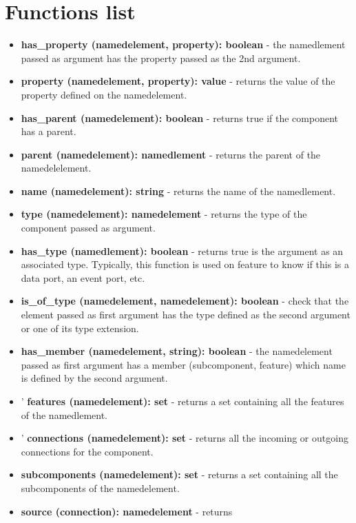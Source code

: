 \documentclass[times, 10pt]{article}
\begin{document}
\section{Functions list}
\begin{itemize}
    \item
	    \textbf{has\_property (namedelement, property): boolean} - the
        namedlement passed as argument has the property passed as the 2nd
        argument.
    \item
	    \textbf{property (namedelement, property): value} - returns
        the value of the property defined on the namedelement.
    \item
	    \textbf{has\_parent (namedelement): boolean} - returns
        true if the component has a parent.
    \item
	    \textbf{parent (namedelement): namedlement} - returns
        the parent of the namedelelement.
    \item
	    \textbf{name (namedelement): string} - returns the name of the
        namedlement.
    \item
	    \textbf{type (namedelement): namedelement} - returns the type
        of the component passed as argument.
    \item
	    \textbf{has\_type (namedlement): boolean} - returns true
        is the argument as an associated type. Typically, this function
        is used on feature to know if this is a data port, an event port, etc.
    \item
        \textbf{is\_of\_type (namedelement, namedelement): boolean} - check
        that the element passed as first argument has the type
        defined as the second argument or one of its type extension.
    \item
	    \textbf{has\_member (namedelement, string): boolean} - the namedelement
        passed as first argument has a member (subcomponent, feature)
        which name is defined by the second argument.
    \item
   '    \textbf{features (namedelement): set} - returns a set containing
        all the features of the namedlement.
    \item
	'   \textbf{connections (namedelement): set} - returns all
        the incoming or outgoing connections for the component.
    \item
	    \textbf{subcomponents (namedelement): set} - returns
        a set containing all the subcomponents of the namedelement.
    \item
        \textbf{source (connection): namedelement}  - returns

\end{itemize}
\end{document}
